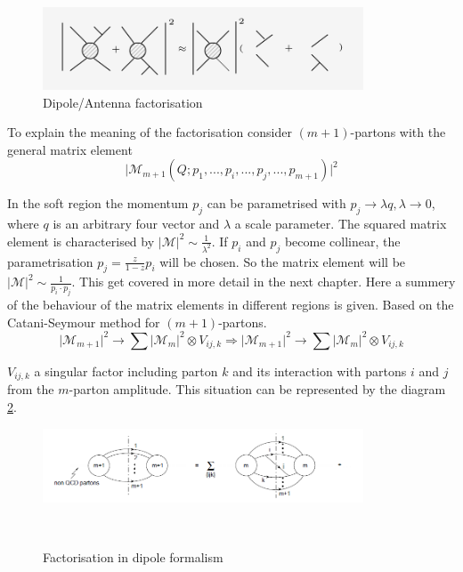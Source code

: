 \begin{figure}[h!]
\centering
\includegraphics[width=0.85\textwidth]{images/Intro/factorization.png}
\caption{Dipole/Antenna factorisation}
\label{Dipole}
\end{figure}
To explain the meaning of the factorisation consider $(m+1)$-partons with the general matrix element~\cite{Seymour:1994we, Catani:2002hc}
\begin{equation}
\vert {{\mathcal{M}}}_{m+1} (Q; p_1,...,p_i,...,p_j,...,p_{m+1}) \vert^2
\end{equation}

In the soft region the momentum $ p_j $ can be parametrised with $ p_j \rightarrow \lambda q, \lambda \rightarrow 0 $, where $ q $ is an arbitrary four vector and $ \lambda $ a scale parameter. 
The squared matrix element is characterised by $ \vert {{\mathcal{M}}} \vert^2 \sim \frac{1}{\lambda^2}$. If $ p_i $ and $ p_j $ become collinear, the parametrisation $ p_j = \frac{z}{1-z} p_i $ will be chosen. So the matrix element will be $ \vert {{\mathcal{M}}} \vert^2 \sim \frac{1}{p_i \cdot p_j}$.
This get covered in more detail in the next chapter. Here a summery of the behaviour of the matrix elements in different regions is given.
Based on the Catani-Seymour method for $(m+1)$-partons. 
\begin{equation}
\vert {{\mathcal{M}}}_{m+1}  \vert^2 \rightarrow \sum \vert {{\mathcal{M}}}_{m}  \vert^2 \otimes V_{ij,k}
\Rightarrow \vert {{\mathcal{M}}}_{m+1}  \vert^2 \rightarrow \sum \vert {{\mathcal{M}}}_{m}  \vert^2 \otimes V_{ij,k}
\end{equation}

$ V_{ij,k} $ a singular factor including parton $k$ and its interaction with partons $i$ and $j$ from the $m$-parton amplitude. This situation can be represented by the diagram \ref{factorisationPic}.

\begin{figure}[h!]
\centering
\includegraphics[width=0.85\textwidth]{images/Intro/factorisationPic.png}
\caption{Factorisation in dipole formalism}
\label{factorisationPic}
~\cite{Catani:1996vz}
\end{figure}

